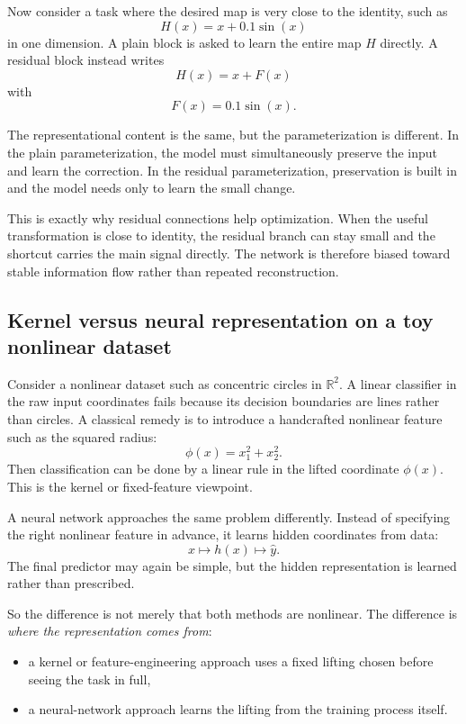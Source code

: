 Now consider a task where the desired map is very close to the identity, such as
\[
 H(x)=x+0.1\sin(x)
\]
in one dimension.
A plain block is asked to learn the entire map $H$ directly.
A residual block instead writes
\[
 H(x)=x+F(x)
\]
with
\[
 F(x)=0.1\sin(x).
\]

\medskip

The representational content is the same, but the parameterization is different.
In the plain parameterization, the model must simultaneously preserve the input and learn the correction.
In the residual parameterization, preservation is built in and the model needs only to learn the small change.

\medskip

This is exactly why residual connections help optimization.
When the useful transformation is close to identity, the residual branch can stay small and the shortcut carries the main signal directly.
The network is therefore biased toward stable information flow rather than repeated reconstruction.

\subsection*{Kernel versus neural representation on a toy nonlinear dataset}

Consider a nonlinear dataset such as concentric circles in $\mathbb R^2$.
A linear classifier in the raw input coordinates fails because its decision boundaries are lines rather than circles.
A classical remedy is to introduce a handcrafted nonlinear feature such as the squared radius:
\[
 \phi(x)=x_1^2+x_2^2.
\]
Then classification can be done by a linear rule in the lifted coordinate $\phi(x)$.
This is the kernel or fixed-feature viewpoint.

\medskip

A neural network approaches the same problem differently.
Instead of specifying the right nonlinear feature in advance, it learns hidden coordinates from data:
\[
 x \mapsto h(x) \mapsto \hat y.
\]
The final predictor may again be simple, but the hidden representation is learned rather than prescribed.

\medskip

So the difference is not merely that both methods are nonlinear.
The difference is \emph{where the representation comes from}:
\begin{itemize}
    \item a kernel or feature-engineering approach uses a fixed lifting chosen before seeing the task in full,
    \item a neural-network approach learns the lifting from the training process itself.
\end{itemize}

